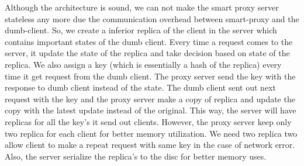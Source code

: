 Although the architecture is sound, we can not make the smart proxy server stateless any more due the communication overhead between smart-proxy and the dumb-client. So, we create a inferior replica of the client in the server which contains important states of the dumb client. Every time a request comes to the server, it update the state of the replica and take decision based on state of the replica. We also assign a key (which is essentially a hash of the replica) every time it get request from the dumb client. The proxy server send the key with the response to dumb client instead of the state. The dumb client sent out next request with the key and the proxy server make a copy of replica and update the copy with the latest update instead of the original. This way, the server will have replicas for all the key's it send out clients. However, the proxy server keep only two replica for each client for better memory utilization. We need two replica two allow client to make a repeat request with same key in the case of network error. Also, the server serialize the replica's to the disc for better memory uses.

